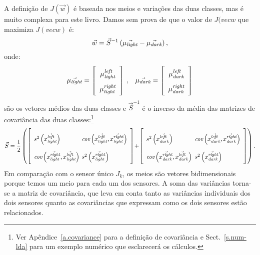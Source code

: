 A definição de $J(\vec{w})$ é baseada nos meios e variações das duas classes, mas é muito complexa para este livro. Damos sem prova de que o valor de $J(vec{w}$ que maximiza $J(vec{w})$ é:
\begin{equation}
\vec{w} = \vec{S}^{-1}\,(\vec{\mu_{\textit{\scriptsize light}}}-\vec{\mu_{\textit{\scriptsize dark}}})\,,\label{eq.wLDA}
\end{equation}
onde:
\[
\renewcommand{\arraystretch}{1.8}
\vec{\mu_{\sub{light}}}=\left[
\begin{array}{c}\mu_{\sub{light}}^{\sub{left}}\\
\mu_{\sub{light}}^{\sub{right}}\end{array}
\right]\,,\;\;\;
\vec{\mu_{\sub{dark}}}=\left[
\begin{array}{c}\mu_{\sub{dark}}^{\sub{left}}\\
\mu_{\sub{dark}}^{\sub{right}}\end{array}\right]
\]
são os vetores médios das duas classes e $\vec{S}^{-1}$ é o inverso da média das matrizes de covariância das duas classes:\footnote{Ver Apêndice~\ref{a.covariance} para a definição de covariância e Sect.~\ref{s.num-lda} para um exemplo numérico que esclarecerá os cálculos.}
\[
\renewcommand{\arraystretch}{2.5}
\vec{S} = \frac{1}{2}\left(
\left[\begin{array}{l@{\hspace{.4em}}l}
s^2\left(\vec{x^{\sub{left}}_\sub{light}}\right) &
\textit{cov}\left(\vec{x^{\sub{left}}_\sub{light}},\vec{x^{\sub{right}}_\sub{light}}\right)\\
\textit{cov}\left(\vec{x^{\sub{right}}_\sub{light}},\vec{x^{\sub{left}}_\sub{light}}\right)&
s^2\left(\vec{x^{\sub{right}}_\sub{light}}\right)
\end{array}\right]
\!+\!
\left[\begin{array}{l@{\hspace{.5em}}l}
s^2\left(\vec{x^{\sub{left}}_\sub{dark}}\right)&
\textit{cov}\left(\vec{x^{\sub{left}}_\sub{dark}},\vec{x^{\sub{right}}_\sub{dark}}\right)\\
\textit{cov}\left(\vec{x^{\sub{right}}_\sub{dark}},\vec{x^{\sub{left}}_\sub{dark}}\right)&
s^2\left(\vec{x^{\sub{right}}_\sub{dark}}\right)
\end{array}\right]\right).
\]
Em comparação com o sensor único $J_k$, os meios são vetores bidimensionais porque temos um meio para cada um dos sensores. A soma das variâncias torna-se a matriz de covariância, que leva em conta tanto as variâncias individuais dos dois sensores quanto as covariâncias que expressam como os dois sensores estão relacionados.


